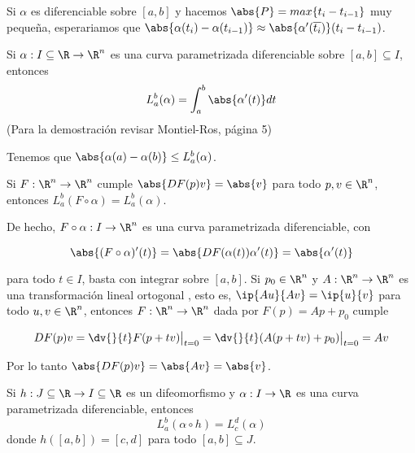 \documentclass{article}
\begin{document}
\noindent Si $\alpha$ es diferenciable sobre $[a,b]$ y hacemos $\abs{P}=max\{t_{i}-t_{i-1}\}$ muy
pequeña, esperariamos que $\abs{\alpha(t_{i})-\alpha(t_{i-1})}\approx
\abs{\alpha'(\overline{t_{i}})}(t_{i}-t_{i-1})$.

\begin{prop}
    Si $\alpha:I\subseteq\R\to\R^{n}$ es una curva parametrizada diferenciable sobre $[a,b]
    \subseteq I$, entonces 
    \begin{equation*}
        L_{a}^{b}(\alpha)=\int_{a}^{b}\abs{\alpha'(t)}dt
    \end{equation*}
    (Para la demostración revisar Montiel-Ros, página 5)
\end{prop}

\begin{cor}
    Tenemos que $\abs{\alpha(a)-\alpha(b)}\leq L_{a}^{b}(\alpha)$.
\end{cor}

\begin{cor}
    Si $F:\R^{n}\to\R^{n}$ cumple $\abs{DF(p)v}=\abs{v}$ para todo $p,v\in\R^{n}$, entonces
    $L_{a}^{b}(F\circ\alpha)=L_{a}^{b}(\alpha)$.
\end{cor}

\noindent De hecho, $F\circ\alpha: I\to\R^{n}$ es una curva parametrizada diferenciable, con

\begin{equation*}
    \abs{(F\circ\alpha)'(t)}=\abs{DF(\alpha(t))\alpha'(t)}=\abs{\alpha'(t)}
\end{equation*}

\noindent para todo $t\in I$, basta con integrar sobre $[a,b]$. Si $p_{0}\in\R^{n}$ y 
$A:\R^{n}\to\R^{n}$ es una transformación lineal ortogonal , esto es, $\ip{Au}{Av}=\ip{u}{v}$ 
para todo $u,v\in\R^{n}$, entonces $F:\R^{n}\to\R^{n}$ dada por $F(p)=Ap+p_{0}$ cumple

\begin{equation*}
    DF(p)v=\dv{}{t}F(p+tv)\big|_{t=0}=\dv{}{t}(A(p+tv)+p_{0})\big|_{t=0}=Av
\end{equation*}

\noindent Por lo tanto $\abs{DF(p)v}=\abs{Av}=\abs{v}$.

\begin{cor}
    Si $h:J\subseteq\R\to I\subseteq\R$ es un difeomorfismo y $\alpha: I\to\R$ es una curva 
    parametrizada diferenciable, entonces
    \begin{equation*}
        L_{a}^{b}(\alpha\circ h)=L_{c}^{d}(\alpha)
    \end{equation*}
    donde $h([a,b])=[c,d]$ para todo $[a,b]\subseteq J$.
\end{cor}
\end{document}
